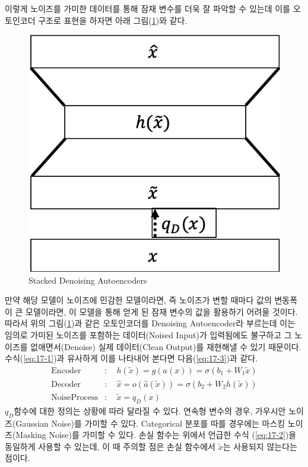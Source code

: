 \documentclass[draft=false]{oblivoir}
\begin{document}
이렇게 노이즈를 가미한 데이터를 통해 잠재 변수를 더욱 잘 파악할 수 있는데 이를 오토인코더 구조로 표현을 하자면 아래 그림(\ref{fig:17-5})와 같다.
 \begin{figure}[ht] \centering
  \includegraphics[scale=0.5]{fig5.png}
  \caption{Stacked Denoising Autoencoders}
  \label{fig:17-5}
\end{figure}
만약 해당 모델이 노이즈에 민감한 모델이라면, 즉 노이즈가 변할 때마다 값의 변동폭이 큰 모델이라면, 이 모델을 통해 얻게 된 잠재 변수의 값을 활용하기 어려울 것이다. 따라서 위의 그림(\ref{fig:17-5})과 같은 오토인코더를 Denoising Autoencoder라 부르는데 이는 임의로 가미된 노이즈를 포함하는 데이터(Noised Input)가 입력됨에도 불구하고 그 노이즈를 없애면서(Denoise) 실제 데이터(Clean Output)를 재현해낼 수 있기 때문이다. 수식(\ref{eq:17-1})과 유사하게 이를 나타내어 본다면 다음(\ref{eq:17-3})과 같다.
\begin{equation}
	\begin{split}
      \mathrm{Encoder} &: \quad h(\tilde{x}) = g(a(x)) = \sigma (b_1 + W_{1}\tilde{x})\\
      \mathrm{Decoder} &: \quad \hat{x} = o(\hat{a}(\tilde{x})) = \sigma (b_2 + W_{2}h(\tilde{x}))\\
      \mathrm{Noise Process} &: \quad \tilde{x} = q_{D}(x)
	\end{split}
	\label{eq:17-3}
\end{equation}
$q_{D}$함수에 대한 정의는 상황에 따라 달라질 수 있다. 연속형 변수의 경우, 가우시안 노이즈(Gaussian Noise)를 가미할 수 있다. Categorical 분포를 따를 경우에는 마스킹 노이즈(Masking Noise)를 가미할 수 있다. 손실 함수는 위에서 언급한 수식 (\ref{eq:17-2})을 동일하게 사용할 수 있는데, 이 때 주의할 점은 손실 함수에서 $\tilde{x}$는 사용되지 않는다는 점이다.
\end{document}
